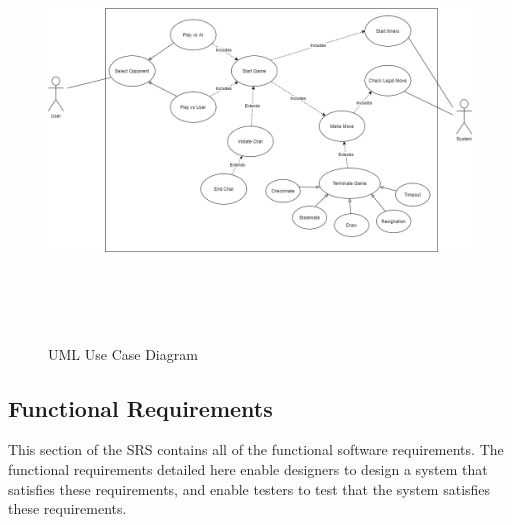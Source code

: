 \documentclass[12pt, titlepage]{article}
\begin{document}
            \begin{figure}[h]
                \centering
                \includegraphics[width=40em,height=30em]{UseCaseDiagram.png}
                \caption{UML Use Case Diagram}
                \label{fig:usecase}
            \end{figure}
            \FloatBarrier

    \subsection{Functional Requirements}
        This section of the SRS contains all of the functional software requirements. The functional requirements detailed here enable designers to design a system that satisfies these requirements, and enable testers to test that the system satisfies these requirements.
        
\end{document}
